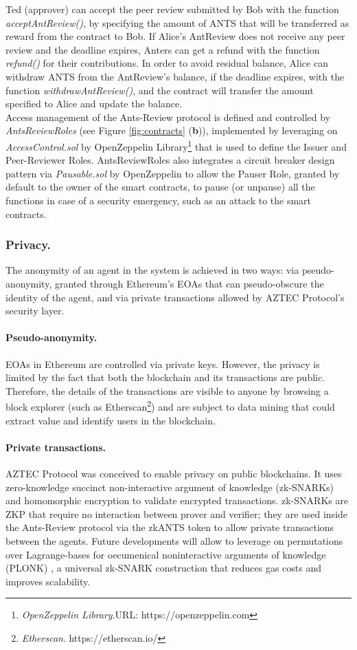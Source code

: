 \documentclass[runningheads]{llncs}
\begin{document}
Ted (approver) can accept the peer review submitted by Bob with the function \emph{acceptAntReview()}, by specifying the amount of ANTS that will be transferred as reward from the contract to Bob.
If Alice's AntReview does not receive any peer review and the deadline expires, Anters can get a refund with the function \emph{refund()} for their contributions. In order to avoid residual balance, Alice can withdraw ANTS from the AntReview's balance, if the deadline expires, with the function \emph{withdrawAntReview()}, and the contract will transfer the amount specified to Alice and update the balance.
\\
Access management of the Ants-Review protocol is defined and controlled by \emph{AntsReviewRoles} (see Figure \ref{fig:contracts} (\textbf{b})), implemented by leveraging on \emph{AccessControl.sol} by OpenZeppelin Library\footnote[10]{\emph{OpenZeppelin Library}.\textsc{URL:} https://openzeppelin.com} that is used to define the Issuer and Peer-Reviewer Roles. AntsReviewRoles also integrates a circuit breaker design pattern via \emph{Pausable.sol} by OpenZeppelin to allow the Pauser Role, granted by default to the owner of the smart contracts, to pause (or unpause) all the functions in case of a security emergency, such as an attack to the smart contracts.

\subsubsection{Privacy.}
The anonymity of an agent in the system is achieved in two ways: via pseudo-anonymity, granted through Ethereum's EOAs that can pseudo-obscure the identity of the agent, and via private transactions allowed by AZTEC \cite{AZTEC} Protocol's security layer.

\paragraph{\textbf{Pseudo-anonymity.}}EOAs in Ethereum are controlled via private keys. However, the privacy is limited by the fact that both the blockchain and its transactions are public.  Therefore, the details of the transactions are visible to anyone by browsing a block explorer (such as Etherscan\footnote[11]{\emph{Etherscan}. https://etherscan.io/}) and are subject to data mining that could extract value and identify users in the blockchain.
\paragraph{\textbf{Private transactions.}}AZTEC Protocol was conceived to enable privacy on public blockchains. It uses zero-knowledge succinct non-interactive argument of knowledge (zk-SNARKs) \cite{zSNARK} and homomorphic encryption \cite{HomEncr} to validate encrypted transactions. zk-SNARKs are ZKP that require no interaction between prover and verifier; they are used inside the Ants-Review protocol via the zkANTS token to allow private transactions between the agents. Future developments will allow to leverage on permutations over Lagrange-bases for oecumenical  noninteractive arguments of knowledge (PLONK) \cite{PLONK}, 
a universal zk-SNARK construction that reduces gas costs and improves scalability.
\end{document}
